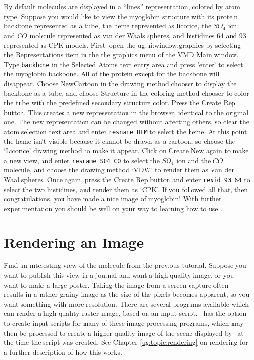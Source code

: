 By default molecules are displayed in a ``lines'' representation, 
colored by atom type.
Suppose you would like to view the myoglobin structure with its
protein backbone represented as a tube, the heme represented as
licorice, the $SO_4$ ion and $CO$ molecule represented as van der
Waals spheres, and histidines 64 and 93 represented as CPK
models. 
First, open the
\hyperref{{\sf Graphics} window}{{\sf Graphics} window [\S }{]}{ug:ui:window:graphics}
by selecting the {\sf Representations} item in the the graphics menu
of the VMD Main window. 
Type {\tt backbone} in the {\sf Selected Atoms} text entry
area and press 'enter' to select the myoglobin backbone.  All of the
protein except for the backbone will disappear.  
Choose {\sf NewCartoon} in the drawing method chooser to display the backbone 
as a tube, and choose {\sf Structure} in the coloring method chooser 
to color the tube with the predefined secondary structure color.  
Press the {\sf Create Rep} button.  This creates a new representation 
in the browser, identical to the original one.  The new representation 
can be changed without affecting others, so clear the atom selection 
text area and enter {\tt resname HEM} to select the heme.  At this point
the heme isn't visible because it cannot be drawn as a cartoon, so choose
the `Licorice' drawing method 
to make it appear.  Click on {\sf Create
New} again to make a new view, and enter {\tt resname SO4 CO} to
select the $SO_4$ ion and the $CO$ molecule, and choose the drawing
method `VDW' to render them as Van der Waal spheres.  Once again,
press the {\sf Create Rep} button and enter {\tt resid 93 64} to
select the two histidines, and render them as `CPK'.  
If you followed all that, then congratulations, you have made a nice 
image of myoglobin!  With further experimentation you should be 
well on your way to learning how to use \VMD.

\section{Rendering an Image}
  Find an interesting view of the molecule from the previous
tutorial.  Suppose you want to publish this view in a journal and want
a high quality image, or you want to make a large poster.  Taking the
image from a screen capture often results in a rather grainy image as the
size of the pixels becomes apparent, so you want something with more
resolution.  There are several programs available which can render a
high-quality raster image, based on an input script.  \VMD\ has the option
to create input scripts for many of these image processing programs,
which may then be processed to create a higher quality
image of the scene displayed by \VMD\ at the time the script was created.
See Chapter \ref{ug:topic:rendering} on rendering
for a further description of how this works.

